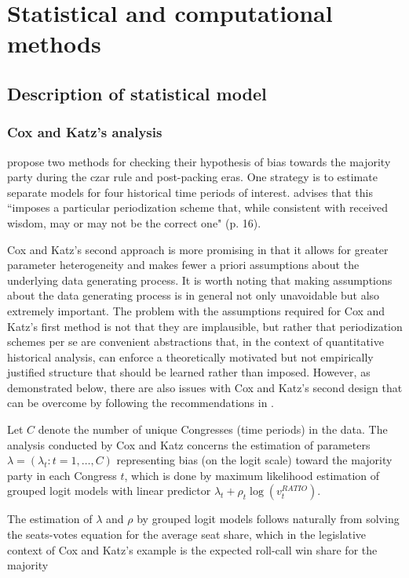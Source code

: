 \section{Statistical and computational methods}
\subsection{Description of statistical model}
\label{subsection_methods}

\subsubsection{Cox and Katz's analysis}

 propose two methods for checking their hypothesis of bias towards the majority party during the czar rule and post-packing eras. One strategy is to estimate separate models for four historical time periods of interest.  advises that this ``imposes a particular periodization scheme that, while consistent with received wisdom, may or may not be the correct one" (p. 16). 

Cox and Katz's second approach is more promising in that it allows for greater parameter heterogeneity and makes fewer a priori assumptions about the underlying data generating process. It is worth noting that making assumptions about the data generating process is in general not only unavoidable but also extremely important. The problem with the assumptions required for Cox and Katz's first method is not that they are implausible, but rather that periodization schemes per se are convenient abstractions that, in the context of quantitative historical analysis, can enforce a theoretically motivated but not empirically justified structure that should be learned rather than imposed. However, as demonstrated below, there are also issues with Cox and Katz's second design that can be overcome by following the recommendations in . 

Let $C$ denote the number of unique Congresses (time periods) in the data. The analysis conducted by Cox and Katz concerns the estimation of parameters  $\lambda = (\lambda_t : t = 1, \dots, C)$ representing bias (on the logit scale) toward the majority party in each Congress $t$, which is done by maximum likelihood estimation of grouped logit models with linear predictor $ \lambda_t + \rho_t \log{\left(v_t^{RATIO} \right)}$. 

The estimation of $\lambda$ and $\rho$ by grouped logit models follows naturally from solving the seats-votes equation for the average seat share, which in the legislative context of Cox and Katz's example is the expected roll-call win share for the majority 

